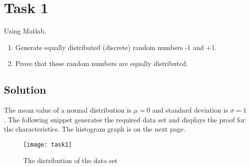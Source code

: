 \section{Task 1}
Using Matlab,
\begin{enumerate}
    \item Generate equally distributed (discrete) random numbers -1 and +1.
    \item Prove that these random numbers are equally distributed.
\end{enumerate}

\subsection*{Solution}
The mean value of a normal distribution is $\mu=0$ and standard deviation is $\sigma=1$. The following snippet generates the required data set and displays the proof for the characteristics. The histogram graph is on the next page.

\begin{listing}[H]
    
\end{listing}

\begin{figure}[H]
    \centering
    \texttt{[image: task1]}
    \caption{The distribution of the data set}
\end{figure}